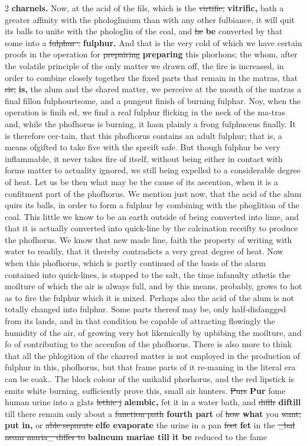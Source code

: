 \documentclass[10pt]{article}
\begin{document}
\begin{multicols}{2}
\textbf{charnels.} Now, at the acid of the fils, which is the \sout{virtific,} \textbf{vitrific,} bath a greater affinity with the phologlinium than with any other fulbiance, it will quit its balls to unite with the phologlin of the coal, and \sout{he} \textbf{be} converted by that some into a \sout{fulphur .} \textbf{fulphur.} And that is the very cold of which we have certain proofs in the operation for \sout{prepairing} \textbf{preparing} this phorhons; the whom, after the volatile principle of the only matter we drawn off, the fire is increased, in order to combine closely together the fixed parts that remain in the matras, that \sout{sis,} \textbf{is,} the alum and the shared matter, we perceive at the mouth of the matras a final fillon fulphourtsome, and a pungent finish of burning fulphar. Noy, when the operation is finih ed, we find a real fulphur flicking in the neck of the ma-tras and, while the phofhorus is burning, it hasn plainly a frong fulphuceus finally. It is therefore cer-tain, that this phofhorus contains an adult fulphur; that is, a means ofgifted to take five with the spreift safe. But though fulphur be very inflammable, it never takes fire of itself, without being either in contact with forms matter to actuality ignored, we still being expelled to a considerable degree of heat. Let us be then what may be the cause of its ascention, when it is a confitment part of the phofhorus. We mention just now, that the acid of the alum quirs its balls, in order to form a fulphur by combining with the phoglition of the coal. This little we know to be an earth outside of being converted into lime, and that it is actually converted into quick-line by the calcination receifty to produce the phofhorus. We know that new made line, faith the property of writing with water to readily, that it thereby contradicts a very great degree of heat. Now when this phofhorus, which is partly continued of the basis of the alarm contained into quick-lines, is stopped to the salt, the time infanulty athetis the moilture of which the air is always full, and by this means, probably, grows to hot as to fire the fulphur which it is mixed. Perhaps also the acid of the alum is not totally changed into fulphur. Some parts thereof may be, only half-disfangged from its lands, and in that condition be capable of attracting flowingly the humidity of the air, of growing very hot likemically by upbibing the moilture, and fo of contributing to the accenfon of the phofhorus. There is also more to think that all the phlogition of the charred matter is not employed in the production of fulphur in this, phofhorus, but that frame parts of it re-maning in the literal era can be coak.. The block colour of the unikalid phorhorus, and the red lipstick is emits white burning, sufficiently prove this, small air hunters. \sout{Purs} \textbf{Pur} fome human urine into a glats \sout{lethic j} \textbf{alembic,} fet it in a water bath, and \sout{difllr} \textbf{diftill} till there remain only about a \sout{function path} \textbf{fourth part} of \sout{how} \textbf{what} you \sout{want,} \textbf{put in,} or \sout{able separate} \textbf{elfe evaporate} the urine in a pan \sout{feet} \textbf{fet} in the \sout{\_bal neam maria\_ differ to} \textbf{balneum mariae till it be} reduced to the fame 
\end{multicols}
\end{document}
